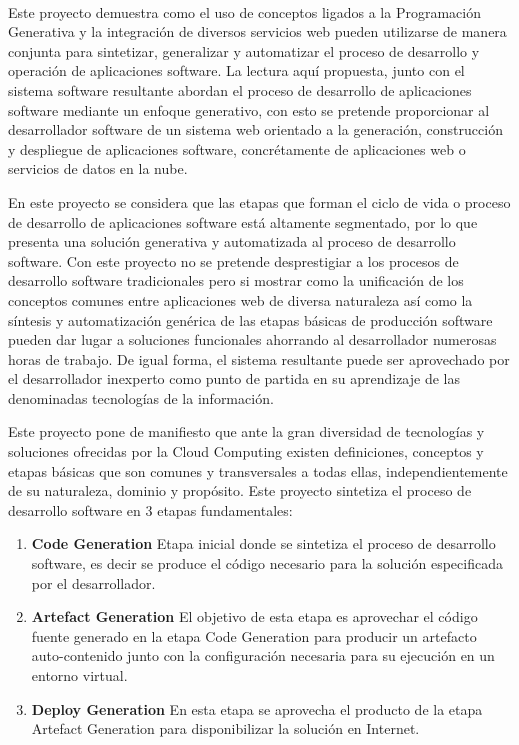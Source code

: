 
\vspace{0.7cm}
\\


Este proyecto demuestra como el uso de conceptos ligados a la  Programación Generativa y la integración de diversos servicios web pueden utilizarse de manera conjunta para sintetizar, generalizar y automatizar el proceso de desarrollo y operación de aplicaciones software. La lectura aquí propuesta, junto con el sistema software resultante abordan  el proceso de desarrollo de aplicaciones software mediante un enfoque generativo, con esto  se pretende proporcionar al desarrollador software de un sistema web orientado a la generación, construcción y despliegue de aplicaciones software, concrétamente de aplicaciones  web o servicios de datos en la nube.
 
 En este proyecto se considera que las etapas que forman el ciclo de vida o proceso de desarrollo de aplicaciones software está altamente segmentado, por lo que presenta una solución generativa y automatizada al proceso de desarrollo software. Con este proyecto no se pretende desprestigiar a los procesos de desarrollo software tradicionales pero si mostrar como la unificación de los conceptos comunes entre aplicaciones web de diversa naturaleza así como la síntesis y  automatización genérica de las etapas básicas de producción software pueden dar lugar a soluciones funcionales ahorrando al desarrollador numerosas horas de trabajo. De igual forma, el sistema resultante  puede ser aprovechado por el desarrollador inexperto como punto de partida en su aprendizaje de las denominadas tecnologías de la información.
 
 
Este proyecto pone de manifiesto que ante la gran diversidad de tecnologías y soluciones ofrecidas por la Cloud Computing  existen definiciones, conceptos y  etapas básicas que son  comunes  y transversales  a todas ellas, independientemente de su naturaleza, dominio y propósito. Este proyecto sintetiza el proceso de desarrollo software en 3 etapas fundamentales: 

\begin{enumerate}
\item \textbf{ Code Generation }  Etapa inicial donde se sintetiza el proceso de desarrollo software, es decir se produce el código necesario para la solución especificada por el desarrollador. 
\item \textbf{ Artefact Generation }  El objetivo de esta etapa es aprovechar el código fuente generado en la etapa Code Generation para producir un artefacto auto-contenido junto con la configuración necesaria para su ejecución en un entorno virtual. 
\item \textbf{ Deploy Generation } En esta etapa se aprovecha el producto de la etapa Artefact Generation para disponibilizar la solución en Internet. 
\end{enumerate}
 

